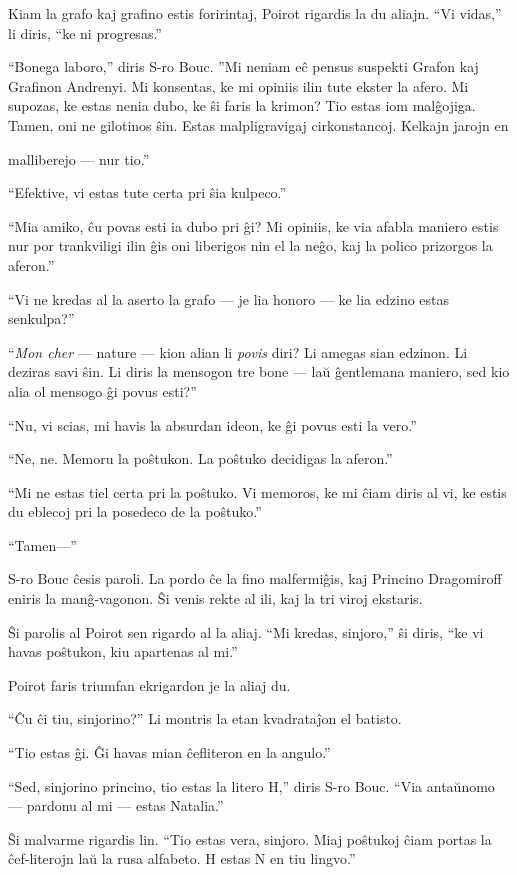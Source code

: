Kiam la grafo kaj grafino estis foririntaj, Poirot rigardis la du aliajn. ``Vi vidas,'' li diris, ``ke ni progresas.''

``Bonega laboro,'' diris S-ro Bouc. ''Mi neniam eĉ pensus suspekti Grafon kaj Grafinon Andrenyi. Mi konsentas, ke mi opiniis ilin tute ekster la afero. Mi supozas, ke estas nenia dubo, ke ŝi faris la krimon? Tio estas iom malĝojiga. Tamen, oni ne gilotinos ŝin. Estas malpligravigaj cirkonstancoj. Kelkajn jarojn en

malliberejo --- nur tio.''

``Efektive, vi estas tute certa pri ŝia kulpeco.''

``Mia amiko, ĉu povas esti ia dubo pri ĝi? Mi opiniis, ke via afabla maniero estis nur por trankviligi ilin ĝis oni liberigos nin el la neĝo, kaj la polico prizorgos la aferon.''

``Vi ne kredas al la aserto la grafo --- je lia honoro --- ke lia edzino estas senkulpa?''

``\emph{Mon cher} --- nature --- kion alian li \emph{povis} diri? Li amegas sian edzinon. Li deziras savi ŝin. Li diris la mensogon tre bone --- laŭ ĝentlemana maniero, sed kio alia ol mensogo ĝi povus esti?''

``Nu, vi scias, mi havis la absurdan ideon, ke ĝi povus esti la vero.''

``Ne, ne. Memoru la poŝtukon. La poŝtuko decidigas la aferon.''

``Mi ne estas tiel certa pri la poŝtuko. Vi memoros, ke mi ĉiam diris al vi, ke estis du eblecoj pri la posedeco de la poŝtuko.''

``Tamen---''

S-ro Bouc ĉesis paroli. La pordo ĉe la fino malfermiĝis, kaj Princino Dragomiroff eniris la manĝ-vagonon. Ŝi venis rekte al ili, kaj la tri viroj ekstaris.

Ŝi parolis al Poirot sen rigardo al la aliaj. ``Mi kredas, sinjoro,'' ŝi diris, ``ke vi havas poŝtukon, kiu apartenas al mi.''

Poirot faris triumfan ekrigardon je la aliaj du.

``Ĉu ĉi tiu, sinjorino?'' Li montris la etan kvadrataĵon el batisto.

``Tio estas ĝi. Ĝi havas mian ĉefliteron en la angulo.''

``Sed, sinjorino princino, tio estas la litero H,'' diris S-ro Bouc. ``Via antaŭnomo --- pardonu al mi --- estas Natalia.''

Ŝi malvarme rigardis lin. ``Tio estas vera, sinjoro. Miaj poŝtukoj ĉiam portas la ĉef-literojn laŭ la rusa alfabeto. H estas N en tiu lingvo.''

